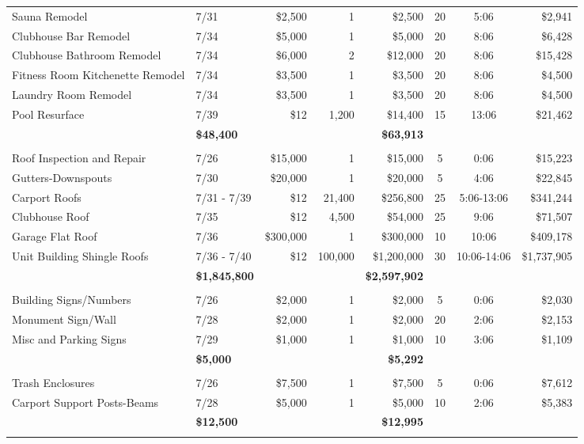 \documentclass[11pt,letterpaper]{article}
\begin{document}
\begin{longtable}{p{4.2cm} p{1.6cm} r r r c c r}
\rowcolor{blue!12} Sauna Remodel & 7/31 & \$2,500 & 1 & \$2,500 & 20 & 5:06 & \$2,941 \\
Clubhouse Bar Remodel & 7/34 & \$5,000 & 1 & \$5,000 & 20 & 8:06 & \$6,428 \\
\rowcolor{blue!12} Clubhouse Bathroom Remodel & 7/34 & \$6,000 & 2 & \$12,000 & 20 & 8:06 & \$15,428 \\
Fitness Room Kitchenette Remodel & 7/34 & \$3,500 & 1 & \$3,500 & 20 & 8:06 & \$4,500 \\
\rowcolor{blue!12} Laundry Room Remodel & 7/34 & \$3,500 & 1 & \$3,500 & 20 & 8:06 & \$4,500 \\
Pool Resurface & 7/39 & \$12 & 1,200 & \$14,400 & 15 & 13:06 & \$21,462 \\
\addlinespace[1pt] \multicolumn{4}{r}{} & \textbf{\$48,400} & & & \textbf{\$63,913} \\
\addlinespace[6pt]
\multicolumn{8}{l}{\textbf{Roofing}} \\
\rowcolor{blue!12} Roof Inspection and Repair & 7/26 & \$15,000 & 1 & \$15,000 & 5 & 0:06 & \$15,223 \\
Gutters-Downspouts & 7/30 & \$20,000 & 1 & \$20,000 & 5 & 4:06 & \$22,845 \\
\rowcolor{blue!12} Carport Roofs & 7/31 - 7/39 & \$12 & 21,400 & \$256,800 & 25 & 5:06-13:06 & \$341,244 \\
Clubhouse Roof & 7/35 & \$12 & 4,500 & \$54,000 & 25 & 9:06 & \$71,507 \\
\rowcolor{blue!12} Garage Flat Roof & 7/36 & \$300,000 & 1 & \$300,000 & 10 & 10:06 & \$409,178 \\
Unit Building Shingle Roofs & 7/36 - 7/40 & \$12 & 100,000 & \$1,200,000 & 30 & 10:06-14:06 & \$1,737,905 \\
\addlinespace[1pt] \multicolumn{4}{r}{} & \textbf{\$1,845,800} & & & \textbf{\$2,597,902} \\
\addlinespace[6pt]
\multicolumn{8}{l}{\textbf{Signage}} \\
\rowcolor{blue!12} Building Signs/Numbers & 7/26 & \$2,000 & 1 & \$2,000 & 5 & 0:06 & \$2,030 \\
Monument Sign/Wall & 7/28 & \$2,000 & 1 & \$2,000 & 20 & 2:06 & \$2,153 \\
\rowcolor{blue!12} Misc and Parking Signs & 7/29 & \$1,000 & 1 & \$1,000 & 10 & 3:06 & \$1,109 \\
\addlinespace[1pt] \multicolumn{4}{r}{} & \textbf{\$5,000} & & & \textbf{\$5,292} \\
\addlinespace[6pt]
\multicolumn{8}{l}{\textbf{Structural}} \\
Trash Enclosures & 7/26 & \$7,500 & 1 & \$7,500 & 5 & 0:06 & \$7,612 \\
\rowcolor{blue!12} Carport Support Posts-Beams & 7/28 & \$5,000 & 1 & \$5,000 & 10 & 2:06 & \$5,383 \\
\addlinespace[1pt] \multicolumn{4}{r}{} & \textbf{\$12,500} & & & \textbf{\$12,995} \\
\addlinespace[6pt]
\bottomrule
\end{longtable}
\end{document}
